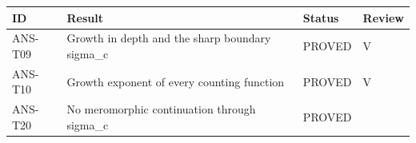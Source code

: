 \documentclass[
  11pt,
]{article}
\begin{document}
\begin{longtable}[]{@{}llll@{}}
\toprule
\begin{minipage}[b]{0.16\columnwidth}\raggedright
ID\strut
\end{minipage} & \begin{minipage}[b]{0.41\columnwidth}\raggedright
Result\strut
\end{minipage} & \begin{minipage}[b]{0.22\columnwidth}\raggedright
Status\strut
\end{minipage} & \begin{minipage}[b]{0.10\columnwidth}\raggedright
Review\strut
\end{minipage}\tabularnewline
\midrule
\endhead
\begin{minipage}[t]{0.16\columnwidth}\raggedright
ANS-T09\strut
\end{minipage} & \begin{minipage}[t]{0.41\columnwidth}\raggedright
Growth in depth and the sharp boundary sigma\_c\strut
\end{minipage} & \begin{minipage}[t]{0.22\columnwidth}\raggedright
PROVED\strut
\end{minipage} & \begin{minipage}[t]{0.10\columnwidth}\raggedright
V\strut
\end{minipage}\tabularnewline
\begin{minipage}[t]{0.16\columnwidth}\raggedright
ANS-T10\strut
\end{minipage} & \begin{minipage}[t]{0.41\columnwidth}\raggedright
Growth exponent of every counting function\strut
\end{minipage} & \begin{minipage}[t]{0.22\columnwidth}\raggedright
PROVED\strut
\end{minipage} & \begin{minipage}[t]{0.10\columnwidth}\raggedright
V\strut
\end{minipage}\tabularnewline
\begin{minipage}[t]{0.16\columnwidth}\raggedright
ANS-T20\strut
\end{minipage} & \begin{minipage}[t]{0.41\columnwidth}\raggedright
No meromorphic continuation through sigma\_c\strut
\end{minipage} & \begin{minipage}[t]{0.22\columnwidth}\raggedright
PROVED\strut
\end{minipage} & \begin{minipage}[t]{0.10\columnwidth}\raggedright

\end{minipage}
\end{longtable}
\end{document}
